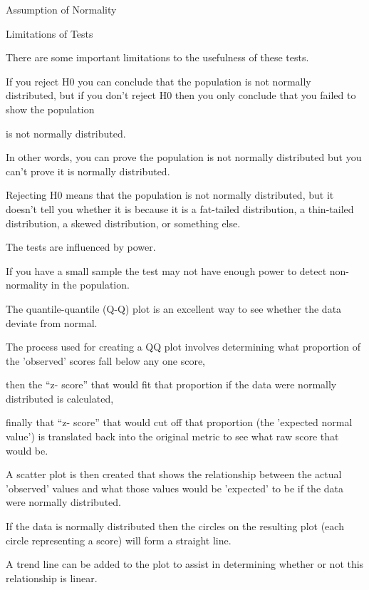 	Assumption of Normality
	
	Limitations of Tests 
\item	There are some important limitations to the usefulness of these tests. 
\item	If you reject H0 you can conclude that the population is not normally distributed, but if you don't reject H0 then you only conclude that you failed to show the population 
\item	is not normally distributed. 
\item	In other words, you can prove the population is not normally distributed but you can't prove it is normally distributed. 
\item	Rejecting H0 means that the population is not normally distributed, but it doesn't tell you whether it is because it is a fat-tailed distribution, a thin-tailed distribution, a skewed distribution, or something else.
\item	The tests are influenced by power. 
\item	If you have a small sample the test may not have enough power to detect non-normality in the population.
	
\item	The quantile-quantile (Q-Q) plot is an excellent way to see whether the data deviate from normal.
\item	The process used for creating a QQ plot involves determining what proportion of the 'observed' scores fall below any one score, 
\item	then the “z- score” that would fit that proportion if the data were normally distributed is calculated,
\item	finally that “z- score” that would cut off that proportion (the 'expected normal value') is translated back into the original metric to see what raw score that would be. 
\item	A scatter plot is then created that shows the relationship between the actual 'observed' values and what those values would be 'expected' to be if the data were normally distributed. 
\item	If the data is normally distributed then the circles on the resulting plot (each circle representing a score) will form a straight line. 
\item	A trend line can be added to the plot to assist in determining whether or not this relationship is linear.
	



